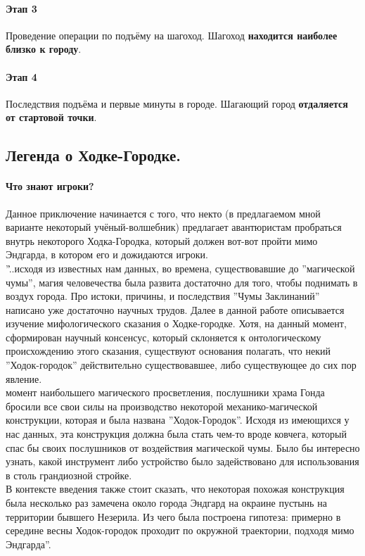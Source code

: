\documentclass[a4paper,12pt,twoside,twocolumn]{book}
\begin{document}
\paragraph{Этап 3} 
Проведение операции по подъёму на шагоход. Шагоход \textbf{находится наиболее близко к городу}.
\paragraph{Этап 4}
Последствия подъёма и первые минуты в городе. Шагающий город \textbf{отдаляется от стартовой точки}. 
\subsection{Легенда о Ходке-Городке.}
\paragraph{Что знают игроки?}
Данное приключение начинается с того, что некто (в предлагаемом мной варианте некоторый учёный-волшебник) предлагает авантюристам пробраться внутрь некоторого Ходка-Городка, 
который должен вот-вот пройти мимо Эндгарда, в котором его и дожидаются игроки.
\\''\...исходя из известных нам данных, во времена, существовавшие до ''магической чумы'', магия человечества была развита достаточно для того, чтобы поднимать в воздух города. 
Про истоки, причины, и последствия ''Чумы Заклинаний'' написано уже достаточно научных трудов. Далее в данной работе описывается изучение мифологического сказания о Ходке-городке. 
Хотя, на данный момент, сформирован научный консенсус, который склоняется к онтологическому происхождению этого сказания, существуют основания полагать, что некий 
''Ходок-городок'' действительно существовавшее, либо существующее до сих пор явление.
\\ момент наибольшего магического просветления, послушники храма Гонда бросили все свои силы на производство некоторой механико-магической конструкции, которая и была названа 
''Ходок-Городок''. Исходя из имеющихся у нас данных, эта конструкция должна была стать чем-то вроде ковчега, который спас бы своих послушников от воздействия магической чумы. 
Было бы интересно узнать, какой инструмент либо устройство было задействовано для использования в столь грандиозной стройке.
\\В контексте введения также стоит сказать, что некоторая похожая конструкция была несколько раз замечена около города Эндгард на окраине пустынь на территории бывшего 
Незерила. Из чего была построена гипотеза: примерно в середине весны Ходок-городок проходит по окружной траектории, подходя мимо Эндгарда''.
\end{document}
